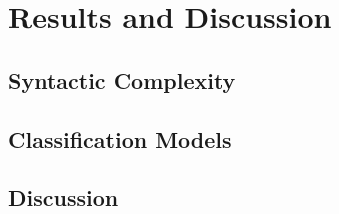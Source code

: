 \chapter{Results and Discussion}
\section{Syntactic Complexity}
\section{Classification Models}
\section{Discussion}
